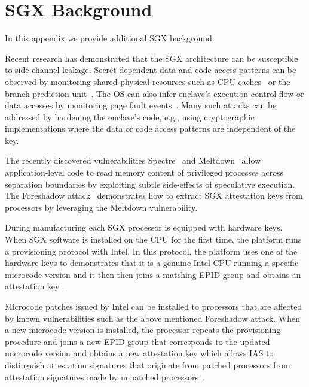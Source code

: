 \section{SGX Background}
\label{sec:background-extra}

In this appendix we provide additional SGX background.


 Recent research has demonstrated that the SGX architecture can be susceptible to side-channel leakage. Secret-dependent data and code access patterns can be observed by monitoring shared physical resources such as CPU caches~\cite{sgxcache,gotzfried2017cache,moghimi2017cachezoom} or the branch prediction unit~\cite{lee2017inferring}. The OS can also infer enclave's execution control flow or data accesses by monitoring page fault events~\cite{xu2015controlled}. Many such attacks can be addressed by hardening the enclave's code, e.g., using cryptographic implementations where the data or code access patterns are independent of the key.

The recently discovered vulnerabilities Spectre~\cite{Kocher2018spectre} and Meltdown~\cite{Lipp2018meltdown} allow application-level code to read memory content of privileged processes across separation boundaries by exploiting subtle side-effects of speculative execution. The Foreshadow attack~\cite{foreshadow-usenix18} demonstrates how to extract SGX attestation keys from processors by leveraging the Meltdown vulnerability. 


During manufacturing each SGX processor is equipped with hardware keys. When SGX software is installed on the CPU for the first time, the platform runs a provisioning protocol with Intel. In this protocol, the platform uses one of the hardware keys to demonstrates that it is a genuine Intel CPU running a specific microcode version and it then then joins a matching EPID group and obtains an attestation key~\cite{epid_attestation}. 

Microcode patches issued by Intel can be installed to processors that are affected by known vulnerabilities such as the above mentioned Foreshadow attack. When a new microcode version is installed, the processor repeats the provisioning procedure and joins a new EPID group that corresponds to the updated microcode version and obtains a new attestation key which allows IAS to distinguish attestation signatures that originate from patched processors from attestation signatures made by unpatched processors~\cite{epid_attestation}.
